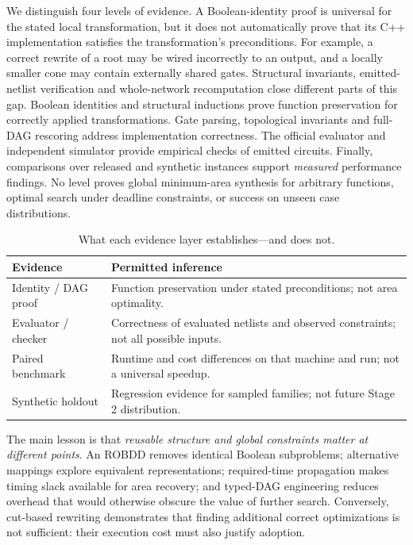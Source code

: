 \documentclass[journal,10pt]{IEEEtran}
\begin{document}
We distinguish four levels of evidence. A Boolean-identity proof is universal for the stated local transformation, but it does not automatically prove that its C++ implementation satisfies the transformation's preconditions. For example, a correct rewrite of a root may be wired incorrectly to an output, and a locally smaller cone may contain externally shared gates. Structural invariants, emitted-netlist verification and whole-network recomputation close different parts of this gap. Boolean identities and structural inductions prove function preservation for correctly applied transformations. Gate parsing, topological invariants and full-DAG rescoring address implementation correctness. The official evaluator and independent simulator provide empirical checks of emitted circuits. Finally, comparisons over released and synthetic instances support \emph{measured} performance findings. No level proves global minimum-area synthesis for arbitrary functions, optimal search under deadline constraints, or success on unseen case distributions.
\begin{table}[!t]
\centering\footnotesize\setlength{\tabcolsep}{3pt}
\caption{What each evidence layer establishes---and does not.}\label{tab:claimscope}
\begin{tabularx}{\columnwidth}{@{}p{}X@{}}\toprule
\textbf{Evidence} & \textbf{Permitted inference}\\\midrule
Identity / DAG proof & Function preservation under stated preconditions; not area optimality.\\
Evaluator / checker & Correctness of evaluated netlists and observed constraints; not all possible inputs.\\
Paired benchmark & Runtime and cost differences on that machine and run; not a universal speedup.\\
Synthetic holdout & Regression evidence for sampled families; not future Stage 2 distribution.\\\bottomrule
\end{tabularx}
\end{table}

The main lesson is that \emph{reusable structure and global constraints matter at different points}. An ROBDD removes identical Boolean subproblems; alternative mappings explore equivalent representations; required-time propagation makes timing slack available for area recovery; and typed-DAG engineering reduces overhead that would otherwise obscure the value of further search. Conversely, cut-based rewriting demonstrates that finding additional correct optimizations is not sufficient: their execution cost must also justify adoption.
\end{document}
